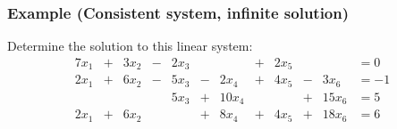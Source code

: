 \documentclass[../linear-algebra.tex]{subfiles}
\begin{document}
\subsubsection{Example (Consistent system, infinite solution)}
Determine the solution to this linear system:
\begin{alignat*}{7}
    x_1  & {}+{} & 3x_2 & {}-{} & 2x_3 &       &       & {}+{} & 2x_5 &       &        &= 0 \\
   2x_1  & {}+{} & 6x_2 & {}-{} & 5x_3 & {}-{} &  2x_4 & {}+{} & 4x_5 & {}-{} &  3x_6  &= -1 \\
         &       &      &       & 5x_3 & {}+{} & 10x_4 &       &      & {}+{} & 15x_6  &= 5 \\
   2x_1  & {}+{} & 6x_2 &       &      & {}+{} &  8x_4 & {}+{} & 4x_5 & {}+{} & 18x_6  &= 6
\end{alignat*}
\end{document}
